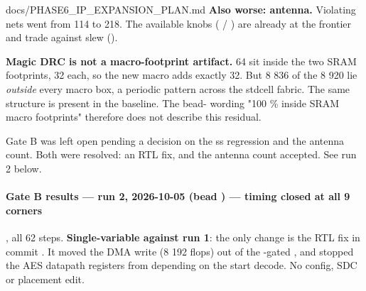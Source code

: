 \begin{relocated}{docs/PHASE6_IP_EXPANSION_PLAN.md}
\textbf{Also worse: antenna.} Violating nets went from 114 to 218. The
available knobs ( / )
are already at the  frontier and trade against slew
().

\textbf{Magic DRC is not a macro-footprint artifact.} 64 
sit inside the two SRAM footprints, 32 each, so the new macro adds
exactly 32. But 8 836 of the 8 920  lie \emph{outside}
every macro box, a periodic pattern across the stdcell fabric. The same
structure is present in the baseline. The bead- wording "100
\% inside SRAM macro footprints" therefore does not describe this
residual.

Gate B was left open pending a decision on the ss regression and the
antenna count. Both were resolved: an RTL fix, and the antenna count
accepted. See run 2 below.

\paragraph{\texorpdfstring{Gate B results --- run 2, 2026-10-05 (bead
) --- \ok{} timing closed at all 9
corners}{Gate B results --- run 2, 2026-10-05 (bead ) ---  timing closed at all 9 corners}}\label{ds:ch:phase6-ip-expansion-plan:gate-b-results-run-2-2026-10-05-bead-f7vs15-white-check-mark-timing-closed-at-all-9-corners}

, all 62 steps. \textbf{Single-variable
against run 1}: the only change is the RTL fix in commit .
It moved the DMA  write (8 192 flops) out of the
-gated , and stopped the AES datapath
registers from depending on the  start decode. No
config, SDC or placement edit.

{\small\setlength{\tabcolsep}{4pt}

}
\end{relocated}

